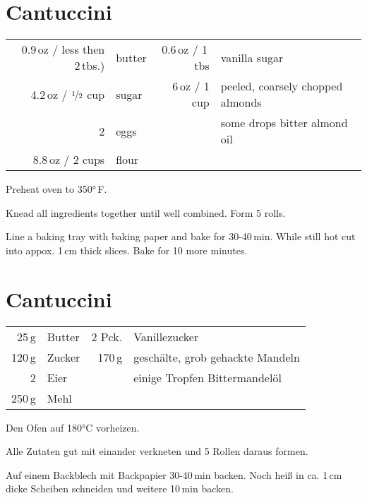 \section{Cantuccini}
\begin{centering}

\end{centering}
\begin{table}[H]
\centering
\begin{tabular*}{1\textwidth}{rlrl}
0.9\,oz / less then 2\,tbs.) & butter & 0.6\,oz / 1\,tbs & vanilla sugar \\
4.2\,oz / $\nicefrac{1}{2}$ cup & sugar & 6\,oz / 1 cup & peeled, coarsely chopped almonds \\
2 & eggs & & some drops bitter almond oil \\
8.8\,oz / 2 cups  & flour & & \\
\end{tabular*}
\end{table}
\begin{Notes}
\item Preheat oven to 350°\,F.
\item Knead all ingredients together until well combined. Form 5 rolls.
\item Line a baking tray with baking paper and bake for 30-40\,min. While still hot cut into appox. 1\,cm thick slices. Bake for 10 more minutes.
\end{Notes}


\section*{Cantuccini}
\begin{centering}

\end{centering}
\begin{table}[H]
\centering
\begin{tabular*}{1\textwidth}{rlrl}
25\,g & Butter &2 Pck. & Vanillezucker \\
120\,g & Zucker & 170\,g & geschälte, grob gehackte Mandeln \\
2 & Eier & & einige Tropfen Bittermandelöl \\
250\,g & Mehl & & \\
\end{tabular*}
\end{table}
\begin{Notes}
\item Den Ofen auf 180°C vorheizen.
\item Alle Zutaten gut mit einander verkneten und 5 Rollen daraus formen.
\item Auf einem Backblech mit  Backpapier 30-40\,min backen. Noch heiß in ca. 1\,cm dicke Scheiben schneiden und weitere 10\,min backen.
\end{Notes}

